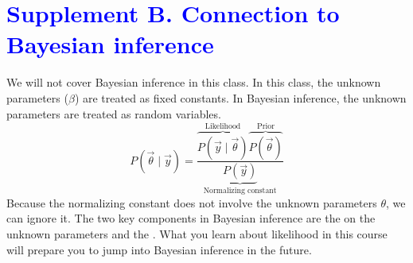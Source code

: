 \documentclass[11pt]{article}
\newcommand{\bblue}[1]{\textbf{\textcolor{blue}{#1}}}
\newcommand{\bgreen}[1]{\textbf{\color{olive}{#1}}}
\begin{document}
\section{\bblue{Supplement B. Connection to Bayesian inference}}
\label{bayes}
We will not cover Bayesian inference in this class. In this class, the unknown parameters ($\beta$) are treated as fixed constants. In Bayesian inference, the unknown parameters are treated as random variables.
$$P(\vec\theta\mid \vec{y}) = \frac{\overbrace{P(\vec{y}\mid \vec\theta)}^\text{Likelihood}\overbrace{P(\vec\theta)}^\text{Prior}}{\underbrace{P(\vec{y})}_\text{Normalizing constant}}$$
Because the normalizing constant does not involve the unknown parameters $\theta$, we can ignore it. The two key components in Bayesian inference are the \bgreen{prior distribution} on the unknown parameters and the \bgreen{likelihood}. What you learn about likelihood in this course will prepare you to jump into Bayesian inference in the future.
\end{document}
